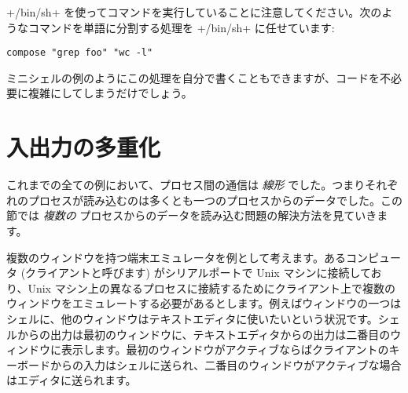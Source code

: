 \ml+/bin/sh+ を使ってコマンドを実行していることに注意してください。次のようなコマンドを単語に分割する処理を \ml+/bin/sh+ に任せています:
%
\begin{lstlisting}
compose "grep foo" "wc -l"
\end{lstlisting}
%
ミニシェルの例のようにこの処理を自分で書くこともできますが、コードを不必要に複雑にしてしまうだけでしょう。

\section{入出力の多重化}

これまでの全ての例において、プロセス間の通信は \emph{線形} でした。つまりそれぞれのプロセスが読み込むのは多くとも一つのプロセスからのデータでした。この節では \emph{複数の} プロセスからのデータを読み込む問題の解決方法を見ていきます。

複数のウィンドウを持つ端末エミュレータを例として考えます。あるコンピュータ (クライアントと呼びます) がシリアルポートで Unix マシンに接続しており、Unix マシン上の異なるプロセスに接続するためにクライアント上で複数のウィンドウをエミュレートする必要があるとします。例えばウィンドウの一つはシェルに、他のウィンドウはテキストエディタに使いたいという状況です。シェルからの出力は最初のウィンドウに、テキストエディタからの出力は二番目のウィンドウに表示します。最初のウィンドウがアクティブならばクライアントのキーボードからの入力はシェルに送られ、二番目のウィンドウがアクティブな場合はエディタに送られます。

